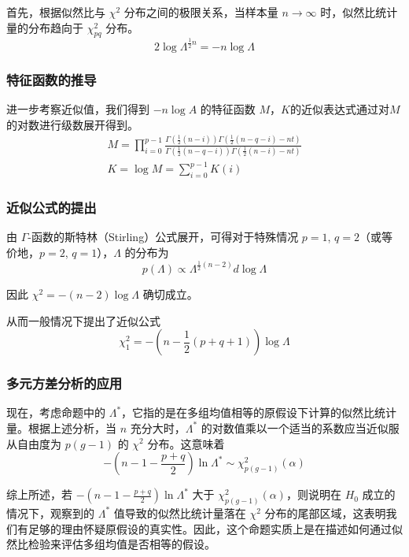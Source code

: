 \documentclass{article} %
\begin{document}
首先，根据似然比与 \(\chi^2\) 分布之间的极限关系，当样本量 \(n \rightarrow \infty\) 时，似然比统计量的分布趋向于 \(\chi^2_{pq}\) 分布。
\[
2 \log \Lambda^{\frac{1}{2}n} = - n \log \Lambda
\]

\subsubsection{特征函数的推导}

进一步考察近似值，我们得到 \(- n\log A\) 的特征函数 \(M\)，\(K\)的近似表达式通过对\(M\)的对数进行级数展开得到。
\[
\begin{gathered}
M=\prod_{i=0}^{p-1} \frac{\Gamma(\frac{1}{2}(n-i)) \Gamma(\frac{1}{2}(n-q-i)-nt) }{\Gamma(\frac{1}{2}(n-q-i)) \Gamma(\frac{1}{2}(n-i)-nt)}\\
K=\log M=\sum_{i=0}^{p-1} K(i)
\end{gathered}
\]

\subsubsection{近似公式的提出}

由 \(\Gamma\)-函数的斯特林（Stirling）公式展开，可得对于特殊情况 \(p = 1\), \(q = 2\)（或等价地，\(p = 2\), \(q = 1\)），\(\Lambda\) 的分布为
\[
p(\Lambda) \propto \Lambda^{\frac{1}{2}(n-2)}d \log \Lambda
\]

因此 \(\chi^2=-(n-2) \log \Lambda\) 确切成立。

从而一般情况下提出了近似公式
\[
\chi_1^2=-\left(n-\frac{1}{2}(p+q+1)\right) \log \Lambda
\]

\subsubsection{多元方差分析的应用}

现在，考虑命题中的 \(\Lambda^\ast\)，它指的是在多组均值相等的原假设下计算的似然比统计量。根据上述分析，当 \(n\) 充分大时，\(\Lambda^\ast\) 的对数值乘以一个适当的系数应当近似服从自由度为 \(p(g-1)\) 的 \(\chi^2\) 分布。这意味着
\[
-\left(n-1-\frac{p+q}{2}\right) \ln \Lambda^\ast \sim \chi^2_{p(g-1)}(\alpha)
\]

综上所述，若 \(-\left(n-1-\frac{p+q}{2}\right) \ln \Lambda^\ast\) 大于 \(\chi^2_{p(g-1)}(\alpha)\)，则说明在 \(H_0\) 成立的情况下，观察到的 \(\Lambda^\ast\) 值导致的似然比统计量落在 \(\chi^2\) 分布的尾部区域，这表明我们有足够的理由怀疑原假设的真实性。因此，这个命题实质上是在描述如何通过似然比检验来评估多组均值是否相等的假设。
\end{document}
